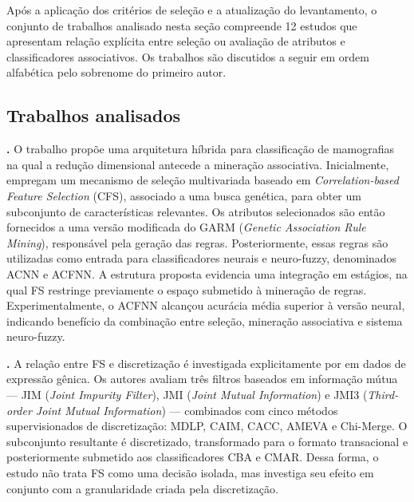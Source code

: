 Após a aplicação dos critérios de seleção e a atualização do levantamento, o conjunto de trabalhos analisado nesta seção compreende 12 estudos que apresentam relação
explícita entre seleção ou avaliação de atributos e classificadores
associativos. Os trabalhos são discutidos a seguir em ordem alfabética pelo
sobrenome do primeiro autor.

\subsection{Trabalhos analisados}
\label{subsec:trabalhos-ca}

\noindent\textbf{.}
O trabalho propõe uma arquitetura híbrida para classificação de mamografias na
qual a redução dimensional antecede a mineração associativa. Inicialmente,
 empregam um mecanismo de seleção
multivariada baseado em \textit{Correlation-based Feature Selection} (CFS),
associado a uma busca genética, para obter um subconjunto de características
relevantes. Os atributos selecionados são então fornecidos a uma versão
modificada do GARM (\textit{Genetic Association Rule Mining}), responsável pela
geração das regras. Posteriormente, essas regras são utilizadas como entrada
para classificadores neurais e neuro-fuzzy, denominados ACNN e ACFNN. A
estrutura proposta evidencia uma integração em estágios, na qual FS restringe
previamente o espaço submetido à mineração de regras. Experimentalmente, o ACFNN
alcançou acurácia média superior à versão neural, indicando benefício da
combinação entre seleção, mineração associativa e sistema neuro-fuzzy.

\medskip

\noindent\textbf{.}
A relação entre FS e discretização é investigada explicitamente por
 em dados de expressão gênica. Os autores
avaliam três filtros baseados em informação mútua --- JIM
(\textit{Joint Impurity Filter}), JMI (\textit{Joint Mutual Information}) e JMI3
(\textit{Third-order Joint Mutual Information}) --- combinados com cinco
métodos supervisionados de discretização: MDLP, CAIM, CACC, AMEVA e
Chi-Merge. O subconjunto resultante é discretizado, transformado para o formato
transacional e posteriormente submetido aos classificadores CBA e CMAR. Dessa
forma, o estudo não trata FS como uma decisão isolada, mas investiga seu efeito
em conjunto com a granularidade criada pela discretização.

